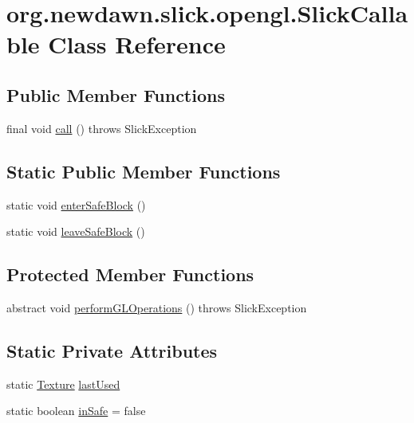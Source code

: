 \hypertarget{classorg_1_1newdawn_1_1slick_1_1opengl_1_1_slick_callable}{}\section{org.\+newdawn.\+slick.\+opengl.\+Slick\+Callable Class Reference}
\label{classorg_1_1newdawn_1_1slick_1_1opengl_1_1_slick_callable}
\subsection*{Public Member Functions}
\begin{DoxyCompactItemize}
\item 
final void \mbox{\hyperlink{classorg_1_1newdawn_1_1slick_1_1opengl_1_1_slick_callable_abbd1e9cef2e0f82396c35e69a1887b48}{call}} ()  throws Slick\+Exception 
\end{DoxyCompactItemize}
\subsection*{Static Public Member Functions}
\begin{DoxyCompactItemize}
\item 
static void \mbox{\hyperlink{classorg_1_1newdawn_1_1slick_1_1opengl_1_1_slick_callable_a7a7a650d0708c6360dfd3e2a59d99828}{enter\+Safe\+Block}} ()
\item 
static void \mbox{\hyperlink{classorg_1_1newdawn_1_1slick_1_1opengl_1_1_slick_callable_acfce604d621582d39c7466096f46af47}{leave\+Safe\+Block}} ()
\end{DoxyCompactItemize}
\subsection*{Protected Member Functions}
\begin{DoxyCompactItemize}
\item 
abstract void \mbox{\hyperlink{classorg_1_1newdawn_1_1slick_1_1opengl_1_1_slick_callable_aa7b2c33eb1b68c7203cc9abdf6b33fc6}{perform\+G\+L\+Operations}} ()  throws Slick\+Exception
\end{DoxyCompactItemize}
\subsection*{Static Private Attributes}
\begin{DoxyCompactItemize}
\item 
static \mbox{\hyperlink{interfaceorg_1_1newdawn_1_1slick_1_1opengl_1_1_texture}{Texture}} \mbox{\hyperlink{classorg_1_1newdawn_1_1slick_1_1opengl_1_1_slick_callable_a1b9a4b045be62c494829982f9a8671f2}{last\+Used}}
\item 
static boolean \mbox{\hyperlink{classorg_1_1newdawn_1_1slick_1_1opengl_1_1_slick_callable_a6f60853b128453504f8184a3b6f4e34b}{in\+Safe}} = false
\end{DoxyCompactItemize}


